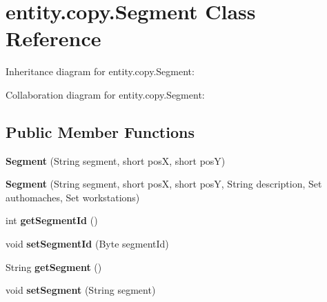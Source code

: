 \hypertarget{classentity_1_1copy_1_1_segment}{}\section{entity.\+copy.\+Segment Class Reference}
\label{classentity_1_1copy_1_1_segment}


Inheritance diagram for entity.\+copy.\+Segment\+:


Collaboration diagram for entity.\+copy.\+Segment\+:
\subsection*{Public Member Functions}
\begin{DoxyCompactItemize}
\item 
\mbox{\label{classentity_1_1copy_1_1_segment_a813c6070191056d5a39f14ab8760eb61}} 
{\bfseries Segment} (String segment, short posX, short posY)
\item 
\mbox{\label{classentity_1_1copy_1_1_segment_ada1f074c6575c766d0cabd2d644fe795}} 
{\bfseries Segment} (String segment, short posX, short posY, String description, Set authomaches, Set workstations)
\item 
\mbox{\label{classentity_1_1copy_1_1_segment_a7e8b1178e3f03b902bbb8ebc071ab2b0}} 
int {\bfseries get\+Segment\+Id} ()
\item 
\mbox{\label{classentity_1_1copy_1_1_segment_a97b528d127b770d7d7b8afad141eda72}} 
void {\bfseries set\+Segment\+Id} (Byte segment\+Id)
\item 
\mbox{\label{classentity_1_1copy_1_1_segment_ad1ee3e2ff33fc76c72828f050145969b}} 
String {\bfseries get\+Segment} ()
\item 
\mbox{\label{classentity_1_1copy_1_1_segment_a87a1c93a1462201e180e97942e55ff43}} 
void {\bfseries set\+Segment} (String segment)
\item 
\mbox{\label{classentity_1_1copy_1_1_segment_af3182267c53965e141a9174cd949b859}} 

\end{DoxyCompactItemize}
